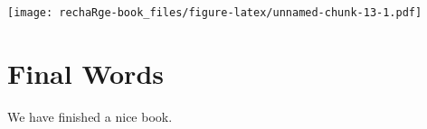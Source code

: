 \documentclass[
]{book}
\begin{document}
\texttt{[image: rechaRge-book\_files/figure-latex/unnamed-chunk-13-1.pdf]}

\hypertarget{final-words}{%
\chapter{Final Words}\label{final-words}}

We have finished a nice book.

  
\end{document}
